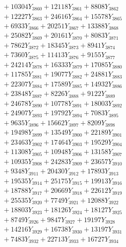 \documentclass[a4paper,10pt]{article}
\begin{document}
{\begin{align}
&\;  + 10304 Y_{3860} + 12118 Y_{3861} + 8808 Y_{3862} \\[0.3ex]
&\;  + 12227 Y_{3863} + 24616 Y_{3864} + 15578 Y_{3865} \\[0.3ex]
&\;  + 6933 Y_{3866} + 20251 Y_{3867} + 13388 Y_{3868} \\[0.5ex]\allowbreak
&\;  + 25082 Y_{3869} + 20161 Y_{3870} + 8083 Y_{3871} \\[0.3ex]
&\;  + 7862 Y_{3872} + 18345 Y_{3873} + 8941 Y_{3874} \\[0.3ex]
&\;  + 7360 Y_{3875} + 11413 Y_{3876} + 9155 Y_{3877} \\[0.3ex]
&\;  + 24214 Y_{3878} + 16333 Y_{3879} + 17085 Y_{3880} \\[0.3ex]
&\;  + 11785 Y_{3881} + 19077 Y_{3882} + 24881 Y_{3883} \\[0.3ex]
&\;  + 22307 Y_{3884} + 17589 Y_{3885} + 14932 Y_{3886} \\[0.3ex]
&\;  + 23848 Y_{3887} + 8226 Y_{3888} + 9122 Y_{3889} \\[0.3ex]
&\;  + 24678 Y_{3890} + 10778 Y_{3891} + 18003 Y_{3892} \\[0.3ex]
&\;  + 24907 Y_{3893} + 19792 Y_{3894} + 7083 Y_{3895} \\[0.3ex]
&\;  + 9635 Y_{3896} + 15662 Y_{3897} + 8209 Y_{3898} \\[0.5ex]\allowbreak
&\;  + 19498 Y_{3899} + 13549 Y_{3900} + 22189 Y_{3901} \\[0.3ex]
&\;  + 23463 Y_{3902} + 17464 Y_{3903} + 19529 Y_{3904} \\[0.3ex]
&\;  + 11308 Y_{3905} + 10948 Y_{3906} + 13158 Y_{3907} \\[0.3ex]
&\;  + 10935 Y_{3908} + 24283 Y_{3909} + 23657 Y_{3910} \\[0.3ex]
&\;  + 9348 Y_{3911} + 20430 Y_{3912} + 17893 Y_{3913} \\[0.3ex]
&\;  + 19535 Y_{3914} + 25175 Y_{3915} + 19913 Y_{3916} \\[0.3ex]
&\;  + 18788 Y_{3917} + 20669 Y_{3918} + 22612 Y_{3919} \\[0.3ex]
&\;  + 25535 Y_{3920} + 7749 Y_{3921} + 12088 Y_{3922} \\[0.3ex]
&\;  + 18803 Y_{3923} + 18126 Y_{3924} + 18127 Y_{3925} \\[0.3ex]
&\;  + 8749 Y_{3926} + 9847 Y_{3927} + 19197 Y_{3928} \\[0.5ex]\allowbreak
&\;  + 14216 Y_{3929} + 16738 Y_{3930} + 13197 Y_{3931} \\[0.3ex]
&\;  + 7483 Y_{3932} + 22713 Y_{3933} + 16727 Y_{3934} \\[0.3ex]

\end{align}}
\end{document}
